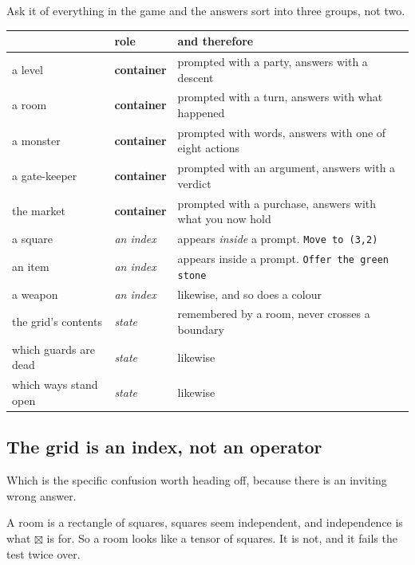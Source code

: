 \documentclass[11pt,a4paper]{article}
\begin{document}
Ask it of everything in the game and the answers sort into three groups, not two.

\begin{center}
\begin{tabular}{@{}l@{\hspace{4mm}}l@{\hspace{4mm}}>{\raggedright\arraybackslash}p{}@{}}
\toprule
& \textbf{role} & \textbf{and therefore} \\
\midrule
a level    & \textbf{container} & prompted with a party, answers with a descent \\
a room     & \textbf{container} & prompted with a turn, answers with what happened \\
a monster  & \textbf{container} & prompted with words, answers with one of eight actions \\
a gate-keeper   & \textbf{container} & prompted with an argument, answers with a verdict \\
the market & \textbf{container} & prompted with a purchase, answers with what you now hold \\
\midrule
a square   & \emph{an index}    & appears \emph{inside} a prompt. \texttt{Move to (3,2)} \\
an item    & \emph{an index}    & appears inside a prompt. \texttt{Offer the green stone} \\
a weapon   & \emph{an index}    & likewise, and so does a colour \\
\midrule
the grid's contents & \emph{state} & remembered by a room, never crosses a boundary \\
which guards are dead & \emph{state} & likewise \\
which ways stand open & \emph{state} & likewise \\
\bottomrule
\end{tabular}
\end{center}

\subsection{The grid is an index, not an operator}

Which is the specific confusion worth heading off, because there is an inviting wrong answer.

A room is a rectangle of squares, squares seem independent, and independence is what
$\boxtimes$ is for. So a room looks like a tensor of squares. It is not, and it fails the test twice
over.
\end{document}
